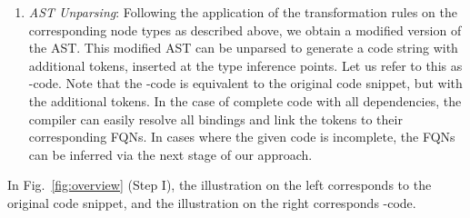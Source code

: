 \begin{enumerate}
    \item \textit{AST Unparsing}: Following the application of the transformation rules on the corresponding node types as described above, we obtain a modified version of the AST. This modified AST can be unparsed to generate a code string with additional  tokens, inserted at the type inference points. Let us refer to this as -code.
    Note that the -code is equivalent to the original code snippet, but with the additional  tokens.
    In the case of complete code with all dependencies, the compiler can easily resolve all bindings and link the  tokens to their corresponding FQNs. In cases where the given code is incomplete, the FQNs can be inferred via the next stage of our approach.
\end{enumerate}  

In Fig.~\ref{fig:overview} (Step I), the illustration on the left corresponds to the original code snippet, and the illustration on the right corresponds -code.


